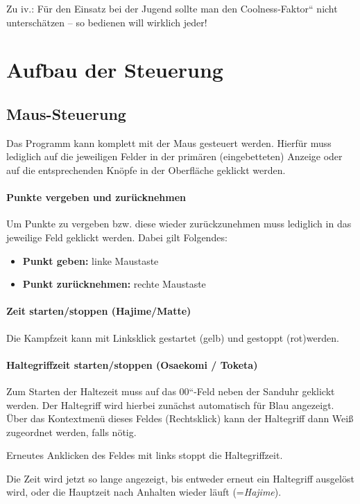 \documentclass[ngerman,12pt,numbers=noenddot]{scrreprt}
\begin{document}
{Zu iv.: F\"ur den Einsatz bei der Jugend sollte man den {\quotedblbase}Coolness-Faktor`` nicht untersch\"atzen -- so bedienen will wirklich jeder!

\section{Aufbau der Steuerung}
\subsection{Maus-Steuerung}
Das Programm kann komplett mit der Maus gesteuert werden. Hierf\"ur muss lediglich auf die jeweiligen Felder in der prim\"aren (eingebetteten) Anzeige oder auf die entsprechenden Kn\"opfe in der Oberfl\"ache geklickt werden.

\paragraph{Punkte vergeben und zur\"ucknehmen}
Um Punkte zu vergeben bzw. diese wieder zur\"uckzunehmen muss lediglich in das jeweilige Feld geklickt werden. Dabei gilt Folgendes:

\begin{itemize}
	\item \textbf{Punkt geben:} linke Maustaste
	\item \textbf{Punkt zur\"ucknehmen:} rechte Maustaste
\end{itemize}

\paragraph{Zeit starten/stoppen (Hajime/Matte)}
Die Kampfzeit kann mit Linksklick gestartet (gelb) und gestoppt (rot)werden.

\paragraph{Haltegriffzeit starten/stoppen (Osaekomi / Toketa)}
{Zum Starten der Haltezeit muss auf das {\quotedblbase}00``-Feld neben der Sanduhr geklickt werden. Der Haltegriff wird hierbei zun\"achst automatisch f\"ur Blau angezeigt. \"Uber das Kontextmen\"u dieses Feldes (Rechtsklick) kann der Haltegriff dann Wei{\ss} zugeordnet werden, falls n\"otig.}

Erneutes Anklicken des Feldes mit links stoppt die Haltegriffzeit.

Die Zeit wird jetzt so lange angezeigt, bis entweder erneut ein Haltegriff ausgel\"ost wird, oder die Hauptzeit nach Anhalten wieder l\"auft (=\textit{Hajime}).

}
\end{document}
